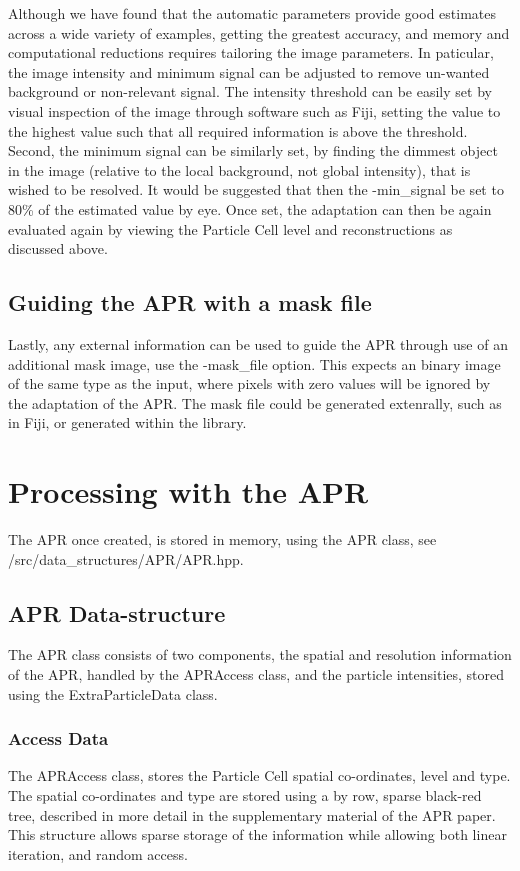 \documentclass[12pt]{article}
\begin{document}
Although we have found that the automatic parameters provide good estimates across a wide variety of examples, getting the greatest accuracy, and memory and computational reductions requires tailoring the image parameters. In paticular, the image intensity and minimum signal can be adjusted to remove un-wanted background or non-relevant signal. The intensity threshold can be easily set by visual inspection of the image through software such as Fiji, setting the value to the highest value such that all required information is above the threshold. Second, the minimum signal can be similarly set, by finding the dimmest object in the image (relative to the local background, not global intensity), that is wished to be resolved. It would be suggested that then the -min\_signal be set to 80\% of the estimated value by eye. Once set, the adaptation can then be again evaluated again by viewing the Particle Cell level and reconstructions as discussed above.
\subsection{Guiding the APR with a mask file}
Lastly, any external information can be used to guide the APR through use of an additional mask image, use the -mask\_file option. This expects an binary image of the same type as the input, where pixels with zero values will be ignored by the adaptation of the APR. The mask file could be generated extenrally, such as in Fiji, or generated within the library.
\section{Processing with the APR}
The APR once created, is stored in memory, using the APR class, see /src/data_structures/APR/APR.hpp.
\subsection{APR Data-structure}
The APR class consists of two components, the spatial and resolution information of the APR, handled by the APRAccess class, and the particle intensities, stored using the ExtraParticleData class.
\subsubsection{Access Data}
The APRAccess class, stores the Particle Cell spatial co-ordinates, level and type. The spatial co-ordinates and type are stored using a by row, sparse black-red tree, described in more detail in the supplementary material of the APR paper. This structure allows sparse storage of the information while allowing both linear iteration, and random access.
\end{document}

